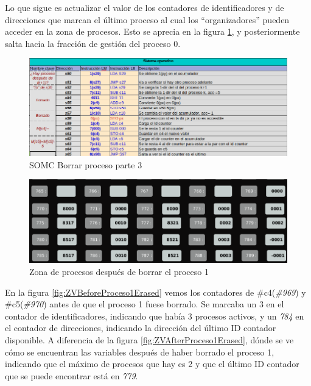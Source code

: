 \documentclass[letterpaper,12pt,oneside]{book}
\begin{document}
		
		Lo que sigue es actualizar el valor de los contadores de identificadores y de direcciones que marcan
		el último proceso  al cual los ``organizadores'' pueden acceder en la zona de procesos. Esto se aprecia
		en la figura \ref{fig:somcBorrar3}, y posteriormente salta hacia la fracción de gestión del proceso 0.
		
		\begin{figure}[h]		
			\centering
			\includegraphics[scale=0.53]{media/CARDIACC/SO_Borrar3.png}
			\caption{ SOMC Borrar proceso parte 3 }
			\label{fig:somcBorrar3}
		\end{figure}		
		
		\begin{figure}[h]		
			\centering
			\includegraphics[scale=0.45]{media/CARDIACC/ZPAfterProceso1Borrado.png}
			\caption{ Zona de procesos después de borrar el proceso 1}
			\label{fig:ZPAfterProceso1Borrado}
		\end{figure}
		
		En la figura \ref{fig:ZVBeforeProceso1Erased} vemos los contadores de \#c4(\textit{\#969}) y \#c5(\textit{\#970}) antes de que el proceso 1 fuese borrado.
		Se marcaba un 3 en el contador de identificadores, indicando que había 3 procesos activos,  y un \textit{784} en el contador de direcciones, 
		indicando la dirección del último ID contador disponible. A diferencia de la figura \ref{fig:ZVAfterProceso1Erased}, dónde se ve cómo 
		se encuentran las variables después de haber borrado el proceso 1, indicando que el máximo de procesos que hay es 2 y que  el último ID contador que se puede encontrar está en \textit{779}.
		
\end{document}
